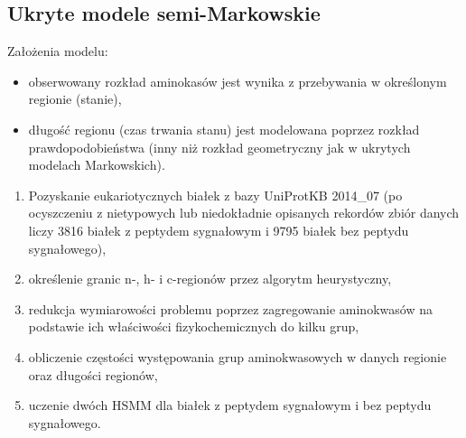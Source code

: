 \documentclass[10pt]{beamer}\usepackage[]{graphicx}\usepackage[]{color}
\begin{document}
\subsection{Ukryte modele semi-Markowskie}


\begin{frame}
      Założenia modelu:
      \begin{itemize}
        \item obserwowany rozkład aminokasów jest wynika z przebywania w określonym regionie (stanie),
        \item długość regionu (czas trwania stanu) jest modelowana poprzez rozkład prawdopodobieństwa (inny niż rozkład geometryczny jak w ukrytych modelach Markowskich).
      \end{itemize}
    \end{frame}

    
    \begin{frame}
      \begin{enumerate}[1.]
        \item Pozyskanie eukariotycznych białek z bazy UniProtKB 2014\_07 (po ocyszczeniu z nietypowych lub niedokładnie opisanych rekordów zbiór danych liczy 3816 białek z peptydem sygnałowym i 9795 białek bez peptydu sygnałowego),
        \item określenie granic n-, h- i c-regionów przez algorytm heurystyczny,
        \item redukcja wymiarowości problemu poprzez zagregowanie aminokwasów na podstawie ich właściwości fizykochemicznych do kilku grup,
        \item obliczenie częstości występowania grup aminokwasowych w danych regionie oraz długości regionów,
        \item uczenie dwóch HSMM dla białek z peptydem sygnałowym i bez peptydu sygnałowego.
      \end{enumerate} 
    \end{frame}
\end{document}
